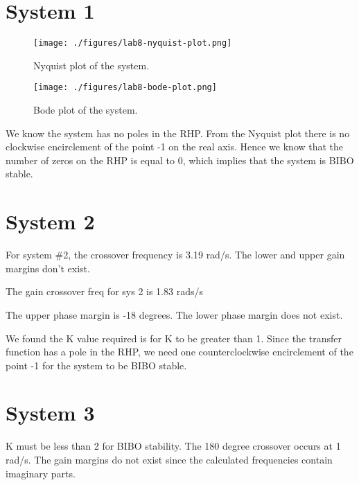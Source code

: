
\section{System 1}
\begin{figure}[H]
	\centering
	\texttt{[image: ./figures/lab8-nyquist-plot.png]}
	\caption{Nyquist plot of the system.}
	\label{fig:}
\end{figure}

\begin{figure}[H]
	\centering
	\texttt{[image: ./figures/lab8-bode-plot.png]}
	\caption{Bode plot of the system.}
	\label{fig:}
\end{figure}

We know the system has no poles in the RHP. From the Nyquist plot there is no clockwise encirclement of the point -1 on the real axis. Hence we know that the number of zeros on the RHP is equal to 0, which implies that the system is BIBO stable.

\section{System 2}

For system \#2, the crossover frequency is 3.19 rad/s. The lower and upper gain margins don't exist.

The gain crossover freq for sys 2 is 1.83 rads/s

The upper phase margin is -18 degrees. The lower phase margin does not exist.

We found the K value required is for K to be greater than 1. Since the transfer function has a pole in the RHP, we need one counterclockwise encirclement of the point -1 for the system to be BIBO stable. 

\section{System 3}

K must be less than 2 for BIBO stability. The 180 degree crossover occurs at 1 rad/s. The gain margins do not exist since the calculated frequencies contain imaginary parts.
